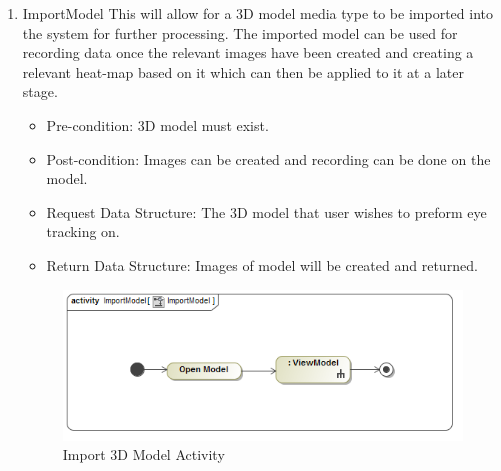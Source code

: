	\begin{enumerate}
		\item{ImportModel}
		\newline
		This will allow for a 3D model media type to be imported into the system for further processing. The imported model can be used for recording data once the relevant images have been created and creating a relevant heat-map based on it which can then be applied to it at a later stage.
		\begin{itemize}
			\item Pre-condition: 3D model must exist.
			\item Post-condition: Images can be created and recording can be done on the model.
			\item Request Data Structure: The 3D model that user wishes to preform eye tracking on.
			\item Return Data Structure: Images of model will be created and returned.
		\end{itemize}
		
		\begin{figure}[!ht]
			\centering
			\includegraphics[scale=0.5,width=15cm,keepaspectratio]{Diagrams/Activity_Diagram__ImportModel__ImportModel.png}
			\caption{Import 3D Model Activity}
		\end{figure}
	

\end{enumerate}
